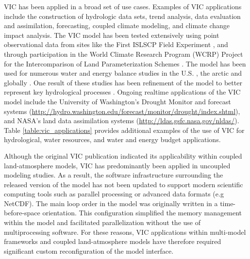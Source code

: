 \documentclass[gmd, manuscript]{copernicus}
\begin{document}
  VIC has been applied in a broad set of use cases.
  Examples of VIC applications include the construction of hydrologic data sets, trend analysis, data evaluation and assimilation, forecasting, coupled climate modeling, and climate change impact analysis.
  The VIC model has been tested extensively using point observational data from sites like the First ISLSCP Field Experiment \citep[FIFE;][]{Liang_1994}, and through participation in the World Climate Research Program (WCRP) Project for the Intercomparison of Land Parameterization Schemes \citep[PILPS; .e.g.][]{Bowling_2003,wood_1998}.
  The model has been used for numerous water and energy balance studies in the U.S. \citep{Abdulla_1997,Nijssen_1997}, the arctic \citep{Adam_2008,Su_2005,Tan_2011,Hamman_2016a} and globally \citep{Nijssen_2001a,Nijssen_2001b,Nijssen_2001c,Sheffield_2009}.
  One result of these studies has been refinement of the model to better represent key hydrological processes \citep{Andreadis_2009,Cherkauer_2003,Liang_1996,Liang_1999}.
  Ongoing realtime applications of the VIC model include the University of Washington’s Drought Monitor and forecast systems (\url{http://hydro.washington.edu/forecast/monitor/drought/index.shtml}), and NASA’s land data assimilation systems (\url{http://ldas.gsfc.nasa.gov/nldas/}).
  Table \ref{table:vic_applications} provides additional examples of the use of VIC for hydrological, water resources, and water and energy budget applications.

  Although the original VIC publication indicated its applicability within coupled land-atmosphere models, VIC has predominantly been applied in uncoupled modeling studies.
  As a result, the software infrastructure surrounding the released version of the model has not been updated to support modern scientific computing tools such as parallel processing or advanced data formats (e.g NetCDF).
  The main loop order in the model was originally written in a time-before-space orientation.
  This configuration simplified the memory management within the model and facilitated parallelization without the use of multiprocessing software.
  For these reasons, VIC applications within multi-model frameworks \citep[e.g. NASA LIS, ][]{Kumar_2006} and coupled land-atmosphere models \citep[e.g. RASM, ][]{Hamman_2016a} have therefore required significant custom reconfiguration of the model interface.
\end{document}
